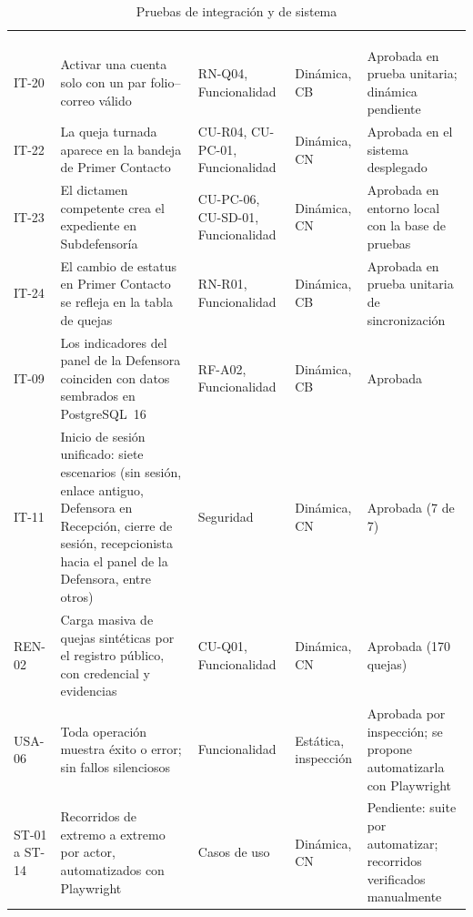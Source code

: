	\small
	\renewcommand{\arraystretch}{1.2}
	\setlength{\tabcolsep}{4pt}
	\begin{longtable}{|p{1.2cm}|L{6.2cm}|L{2.2cm}|L{2.0cm}|L{2.9cm}|}
		\hiderowcolors\caption{Pruebas de integración y de sistema}
		\label{tab:pruebas_integracion} \\ \showrowcolors
		\hline
		 &  &  &
		 &  \\
		\hline
		\endfirsthead
		\hline
		 &  &  &
		 &  \\
		\hline
		\endhead
		IT-20 & Activar una cuenta solo con un par folio--correo válido & RN-Q04, Funcionalidad & Dinámica, CB &
		Aprobada en prueba unitaria; dinámica pendiente \\ \hline
		IT-22 & La queja turnada aparece en la bandeja de Primer Contacto & CU-R04, CU-PC-01, Funcionalidad & Dinámica,
		CN & Aprobada en el sistema desplegado \\ \hline
		IT-23 & El dictamen competente crea el expediente en Subdefensoría & CU-PC-06, CU-SD-01, Funcionalidad & Dinámica,
		CN & Aprobada en entorno local con la base de pruebas \\ \hline
		IT-24 & El cambio de estatus en Primer Contacto se refleja en la tabla de quejas & RN-R01, Funcionalidad &
		Dinámica, CB & Aprobada en prueba unitaria de sincronización \\ \hline
		IT-09 & Los indicadores del panel de la Defensora coinciden con datos sembrados en PostgreSQL~16 &
		RF-A02, Funcionalidad & Dinámica, CB & Aprobada \\ \hline
		IT-11 & Inicio de sesión unificado: siete escenarios (sin sesión, enlace antiguo, Defensora en
		Recepción, cierre de sesión, recepcionista hacia el panel de la Defensora, entre otros) & Seguridad & Dinámica, CN & Aprobada (7 de 7) \\ \hline
		REN-02 & Carga masiva de quejas sintéticas por el registro público, con credencial y evidencias &
		CU-Q01, Funcionalidad & Dinámica, CN & Aprobada (170 quejas) \\ \hline
		USA-06 & Toda operación muestra éxito o error; sin fallos silenciosos & Funcionalidad & Estática, inspección & Aprobada por inspección; se propone automatizarla con Playwright \\ \hline
		ST-01 a ST-14 & Recorridos de extremo a extremo por actor, automatizados con Playwright & Casos de
		uso & Dinámica, CN & Pendiente: suite por automatizar; recorridos verificados manualmente \\ \hline
	\end{longtable}
	\normalsize

